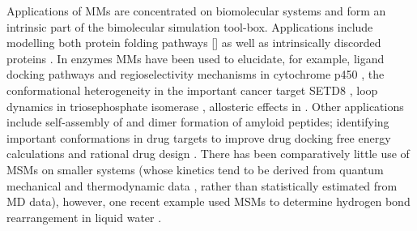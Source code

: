 Applications of MMs are concentrated on biomolecular systems and form an intrinsic part of the bimolecular simulation tool-box\cite{hugginsBiomolecularSimulationsDynamics2019}. Applications include modelling both protein folding pathways [] as well as intrinsically discorded proteins \cite{schorAnalyticalMethodsStructural2016a}. In enzymes MMs have been used to elucidate, for example, ligand docking pathways \cite{ahalawatMappingSubstrateRecognition2018a} and regioselectivity mechanisms in cytochrome p450  \cite{dodaniDiscoveryRegioselectivitySwitch2016a}, the conformational heterogeneity in the important cancer target SETD8 \cite{chenDynamicConformationalLandscape2019a}, loop dynamics in  triosephosphate isomerase \cite{LoopMotionTriosephosphate}, allosteric effects in \cite{wapeesittipanAllostericEffectsCyclophilin2019}. Other applications include self-assembly of  \cite{senguptaAutomatedMarkovState2019} and dimer formation \cite{leahyCoarseMasterEquations2016} of amyloid peptides; identifying important conformations in drug targets to improve drug docking free energy calculations  \cite{amaroEnsembleDockingDrug2018} and rational drug design \cite{gervasioBiomolecularSimulationsStructureBased2019}. There has been comparatively little use of MSMs on smaller systems (whose kinetics tend to be derived from quantum mechanical and thermodynamic data \cite{glowackiMESMEROpenSourceMaster2012}, rather than statistically estimated from MD data), however, one recent example used MSMs to determine hydrogen bond rearrangement in liquid water \cite{schulzCollectiveHydrogenbondRearrangement2018}. 

